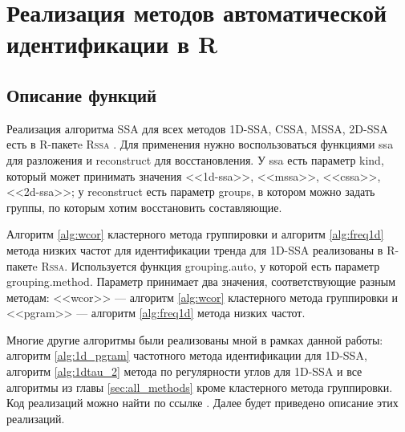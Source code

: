 \documentclass[specialist,
               substylefile = spbu.rtx,
               subf,href,colorlinks=true, 12pt]{disser}
\begin{document}
\chapter{Реализация методов автоматической идентификации в R}
\label{sec:code}
\section{Описание функций}

Реализация алгоритма SSA для всех методов 1D-SSA, CSSA, MSSA, 2D-SSA есть в R-пакетe \textsc{Rssa} \cite{Rssa, Golyandina.Korobeynikov2013}. Для применения нужно воспользоваться функциями ssa для разложения и reconstruct для восстановления.
У ssa есть параметр kind, который может принимать значения <<1d-ssa>>, <<mssa>>, <<cssa>>, <<2d-ssa>>; у reconstruct есть параметр groups, в котором можно задать группы, по которым хотим восстановить составляющие. 

Алгоритм \ref{alg:wcor} кластерного метода группировки и алгоритм \ref{alg:freq1d} метода низких частот для идентификации тренда для 1D-SSA  реализованы в R-пакетe \textsc{Rssa}.
Используется функция grouping.auto, у которой есть параметр grouping.method. Параметр принимает два значения, соответствующие разным методам: <<wcor>> --- алгоритм \ref{alg:wcor} кластерного метода группировки и  <<pgram>> --- алгоритм \ref{alg:freq1d} метода низких частот. 

Многие другие алгоритмы были реализованы мной в рамках данной работы: алгоритм \ref{alg:1d_pgram} частотного метода идентификации для 1D-SSA, алгоритм \ref{alg:1dtau_2} метода по регулярности углов для 1D-SSA и все алгоритмы из главы \ref{sec:all_methods} кроме кластерного метода группировки. Код реализаций можно найти по ссылке \cite{polina_zhornikova_2018_1252476}. Далее будет приведено описание этих реализаций.
\end{document}
